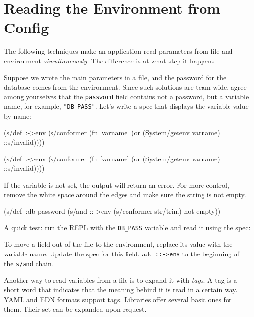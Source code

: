 \section{ Reading the Environment from Config}

The following techniques make an application read parameters from file and environment \emph{simultaneously}. The difference is at what step it happens.

Suppose we wrote the main parameters in a file, and the password for the database comes from the environment. Since such solutions are team-wide, agree among yourselves that the \verb|password| field contains not a password, but a variable name, for example, \verb|"DB_PASS"|. Let's write a spec that displays the variable value by name:

\ifnarrow

\begin{clojure}
(s/def ::->env
  (s/conformer
   (fn [varname]
     (or (System/getenv varname)
         ::s/invalid))))
\end{clojure}

\else

\begin{clojure}
(s/def ::->env
  (s/conformer
   (fn [varname]
     (or (System/getenv varname) ::s/invalid))))
\end{clojure}

\fi

If the variable is not set, the output will return an error. For more control, remove the white space around the edges and make sure the string is not empty.

\begin{clojure}
(s/def ::db-password
  (s/and ::->env
         (s/conformer str/trim)
         not-empty))
\end{clojure}

A quick test: run the REPL with the \verb|DB_PASS| variable and read it using the spec:

\begin{bash}
DB_PASS='*(&fd}A53z#$!' lein repl

(s/conform ::db-password "DB_PASS")
"*(&fd}A53z#$!"
\end{bash}

To move a field out of the file to the environment, replace its value with the variable name. Update the spec for this field: add \verb|::->env| to the beginning of the \verb|s/and| chain.


Another way to read variables from a file is to expand it with \emph{tags}. A tag is a short word that indicates that the meaning behind it is read in a certain way. YAML and EDN formats support tags. Libraries offer several basic ones for them. Their set can be expanded upon request.

